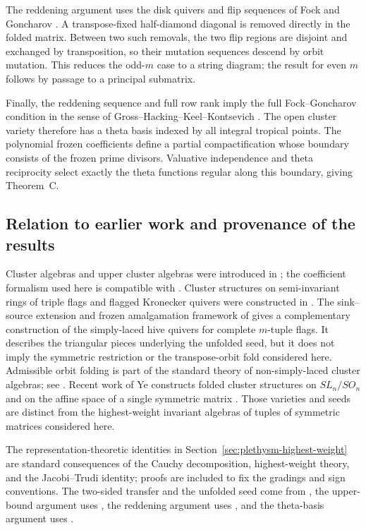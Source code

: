 \documentclass[11pt]{amsart}
\theoremstyle{definition}
\theoremstyle{remark}
\begin{document}
The reddening argument uses the disk quivers and flip sequences of Fock and
Goncharov \cite{FockGoncharov}.  A transpose-fixed half-diamond diagonal is
removed directly in the folded matrix.  Between two such removals, the two
flip regions are disjoint and exchanged by transposition, so their mutation
sequences descend by orbit mutation.  This reduces the odd-$m$ case to a
string diagram; the result for even $m$ follows by passage to a principal
submatrix.

Finally, the reddening sequence and full row rank imply the full
Fock--Goncharov condition in the sense of
Gross--Hacking--Keel--Kontsevich \cite{GHKK}.  The open cluster variety
therefore has a theta basis indexed by all integral tropical points.  The
polynomial frozen coefficients define a partial compactification whose
boundary consists of the frozen prime divisors.  Valuative independence and
theta reciprocity \cite{CMMM} select exactly the theta functions regular
along this boundary, giving Theorem~C.

\subsection{Relation to earlier work and provenance of the results}

Cluster algebras and upper cluster algebras were introduced in
\cite{FZ1,BFZ}; the coefficient formalism used here is compatible with
\cite{FZ4}.  Cluster structures on semi-invariant rings of triple flags and
flagged Kronecker quivers were constructed in
\cite{Fsemi,FeiKroneckerII}.  The sink--source extension and frozen
amalgamation framework of \cite{FeiWeymanExtension} gives a complementary
construction of the simply-laced hive quivers for complete $m$-tuple flags.
It describes the triangular pieces underlying the unfolded seed, but it does
not imply the symmetric restriction or the transpose-orbit fold considered
here.  Admissible orbit folding is part of the standard theory of
non-simply-laced cluster algebras; see \cite{DupontFolding}.  Recent work of
Ye constructs folded cluster structures on $SL_n/SO_n$ and on the affine
space of a single symmetric matrix \cite{YeSymmetric}.  Those varieties and
seeds are distinct from the highest-weight invariant algebras of tuples of
symmetric matrices considered here.

The representation-theoretic identities in
Section~\ref{sec:plethysm-highest-weight} are standard consequences of the
Cauchy decomposition, highest-weight theory, and the Jacobi--Trudi identity;
proofs are included to fix the gradings and sign conventions.  The two-sided
transfer and the unfolded seed come from
\cite{Grosshans,FeiKroneckerII}, the upper-bound argument uses \cite{GSV},
the reddening argument uses \cite{FockGoncharov,CaoString,CaoLi}, and the
theta-basis argument uses \cite{GHKK,CMMM}.
\end{document}
